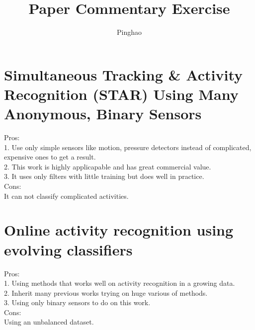 \documentclass[a4paper]{article}
\title{Paper Commentary Exercise}
\author{Pinghao}
\begin{document}
\maketitle

\section{Simultaneous Tracking & Activity Recognition (STAR)
Using Many Anonymous, Binary Sensors}

Pros:\\

1. Use only simple sensors like motion, pressure detectors instead of complicated, expensive ones to get a result.\\

2. This work is highly applicapable and has great commercial value.\\

3. It uses only filters with little training but does well in  practice.\\ 

Cons:\\

It can not classify complicated activities.\\

\section{Online activity recognition using evolving classifiers}

Pros:\\

1. Using methods that works well on activity recognition in a growing data.\\

2. Inherit many previous works trying on huge various of methods.\\

3. Using only binary sensors to do on this work.\\ 

Cons:
\\

Using an unbalanced dataset.\\
\end{document}
